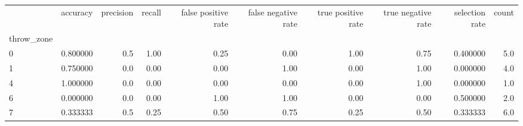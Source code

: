 \begin{tabular}{lrrrrrrrrr}
\toprule
{} &  accuracy &  precision &  recall &  false positive rate &  false negative rate &  true positive rate &  true negative rate &  selection rate &  count \\
throw\_zone &           &            &         &                      &                      &                     &                     &                 &        \\
\midrule
0          &  0.800000 &        0.5 &    1.00 &                 0.25 &                 0.00 &                1.00 &                0.75 &        0.400000 &    5.0 \\
1          &  0.750000 &        0.0 &    0.00 &                 0.00 &                 1.00 &                0.00 &                1.00 &        0.000000 &    4.0 \\
4          &  1.000000 &        0.0 &    0.00 &                 0.00 &                 0.00 &                0.00 &                1.00 &        0.000000 &    1.0 \\
6          &  0.000000 &        0.0 &    0.00 &                 1.00 &                 1.00 &                0.00 &                0.00 &        0.500000 &    2.0 \\
7          &  0.333333 &        0.5 &    0.25 &                 0.50 &                 0.75 &                0.25 &                0.50 &        0.333333 &    6.0 \\
\bottomrule
\end{tabular}
